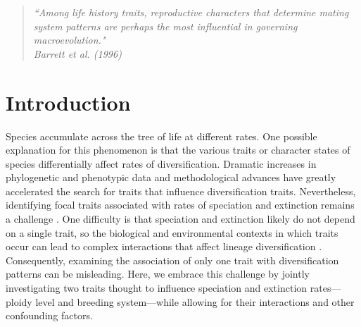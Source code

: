 \begin{quote}
\em{``Among life history traits, reproductive characters that determine mating system patterns are perhaps the most influential in governing macroevolution." 
}
\\
\hspace*{\fill}\rm{ Barrett et al. (1996)}
\end{quote}

\section{Introduction}

Species accumulate across the tree of life at different rates. 
One possible explanation for this phenomenon is that the various traits or character states of species differentially affect rates of diversification. 
Dramatic increases in phylogenetic and phenotypic data and methodological advances have greatly accelerated the search for traits that influence diversification traits.
Nevertheless, identifying focal traits associated with rates of speciation and extinction remains a challenge \citep[\eg][]{maddison_2015, rabosky_2015, beaulieu_2016, rabosky_2017}. 
One difficulty is that speciation and extinction likely do not depend on a single trait, so the biological and environmental contexts in which traits occur can lead to complex interactions that affect lineage diversification \citep{beaulieu_2016, caetano_2018, herrera_2018}.
Consequently, examining the association of only one trait with diversification patterns can be misleading. 
Here, we embrace this challenge by jointly investigating two traits thought to influence speciation and extinction rates---ploidy level and breeding system---while allowing for their interactions and other confounding factors.

